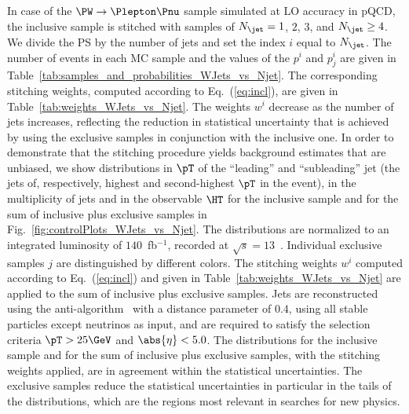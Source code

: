 In case of the $\PW \to \Plepton\Pnu$ sample simulated at LO accuracy in pQCD,
the inclusive sample is stitched with samples of $N_{\jet} = 1$, $2$, $3$, and $N_{\jet} \geq 4$.
We divide the PS by the number of jets and set the index $i$ equal to $N_{\jet}$.
The number of events in each MC sample and the values of the $p^{i}$ and $p_{j}^{i}$ are given in Table~\ref{tab:samples_and_probabilities_WJets_vs_Njet}.
The corresponding stitching weights, computed according to Eq.~(\ref{eq:incl}), are given in Table~\ref{tab:weights_WJets_vs_Njet}.
The weights $w^{i}$ decrease as the number of jets increases, 
reflecting the reduction in statistical uncertainty that is achieved by using the exclusive samples in conjunction with the inclusive one.
In order to demonstrate that the stitching procedure yields background estimates that are unbiased,
we show distributions in $\pT$ of the ``leading'' and ``subleading'' jet (the jets of, respectively, highest and second-highest $\pT$ in the event),
in the multiplicity of jets and in the observable $\HT$ 
for the inclusive sample and for the sum of inclusive plus exclusive samples in Fig.~\ref{fig:controlPlots_WJets_vs_Njet}.
The distributions are normalized to an integrated luminosity of $140$~fb$^{-1}$, recorded at $\sqrt{s}=13$~\TeV.
Individual exclusive samples $j$ are distinguished by different colors.
The stitching weights $w^{i}$ computed according to Eq.~(\ref{eq:incl}) and given in Table~\ref{tab:weights_WJets_vs_Njet} are applied to the sum of inclusive plus exclusive samples.
Jets are reconstructed using the anti-\kt algorithm~\cite{Cacciari:2008gp,Cacciari:2011ma} with a distance parameter of $0.4$,
using all stable particles except neutrinos as input, and are required to satisfy the selection criteria $\pT > 25\GeV$ and $\abs{\eta} < 5.0$.
The distributions for the inclusive sample and for the sum of inclusive plus exclusive samples, with the stitching weights applied, are in agreement within the statistical uncertainties.
The exclusive samples reduce the statistical uncertainties in particular in the tails of the distributions,
which are the regions most relevant in searches for new physics.

